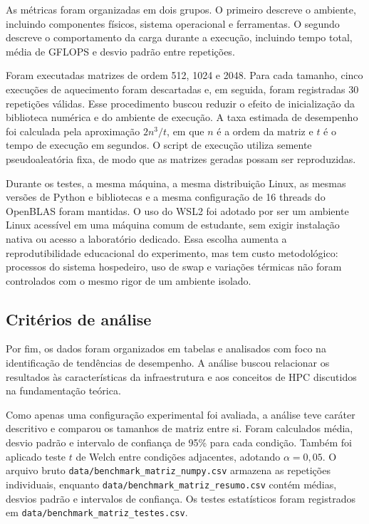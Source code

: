 As métricas foram organizadas em dois grupos. O primeiro descreve o ambiente, incluindo componentes físicos, sistema operacional e ferramentas. O segundo descreve o comportamento da carga durante a execução, incluindo tempo total, média de GFLOPS e desvio padrão entre repetições.

Foram executadas matrizes de ordem 512, 1024 e 2048. Para cada tamanho, cinco execuções de aquecimento foram descartadas e, em seguida, foram registradas 30 repetições válidas. Esse procedimento buscou reduzir o efeito de inicialização da biblioteca numérica e do ambiente de execução. A taxa estimada de desempenho foi calculada pela aproximação $2n^3/t$, em que $n$ é a ordem da matriz e $t$ é o tempo de execução em segundos. O script de execução utiliza semente pseudoaleatória fixa, de modo que as matrizes geradas possam ser reproduzidas.

Durante os testes, a mesma máquina, a mesma distribuição Linux, as mesmas versões de Python e bibliotecas e a mesma configuração de 16 threads do OpenBLAS foram mantidas. O uso do WSL2 foi adotado por ser um ambiente Linux acessível em uma máquina comum de estudante, sem exigir instalação nativa ou acesso a laboratório dedicado. Essa escolha aumenta a reprodutibilidade educacional do experimento, mas tem custo metodológico: processos do sistema hospedeiro, uso de swap e variações térmicas não foram controlados com o mesmo rigor de um ambiente isolado.

\subsection{Critérios de análise}

Por fim, os dados foram organizados em tabelas e analisados com foco na identificação de tendências de desempenho. A análise buscou relacionar os resultados às características da infraestrutura e aos conceitos de HPC discutidos na fundamentação teórica.

Como apenas uma configuração experimental foi avaliada, a análise teve caráter descritivo e comparou os tamanhos de matriz entre si. Foram calculados média, desvio padrão e intervalo de confiança de 95\% para cada condição. Também foi aplicado teste $t$ de Welch entre condições adjacentes, adotando $\alpha=0{,}05$. O arquivo bruto \texttt{data/benchmark\_matriz\_numpy.csv} armazena as repetições individuais, enquanto \texttt{data/benchmark\_matriz\_resumo.csv} contém médias, desvios padrão e intervalos de confiança. Os testes estatísticos foram registrados em \texttt{data/benchmark\_matriz\_testes.csv}.

